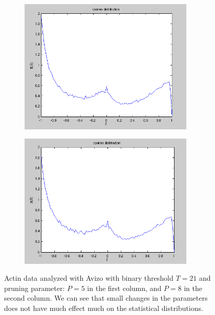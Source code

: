 \begin{figure}[H]
\begin{subfigure}{0.45\textwidth}
    \includegraphics[width=0.92\textwidth]{Figures/chapter-image/avizo/ActinZ39b21l5-histo-cosines.png}%
  \end{subfigure}
  \begin{subfigure}{0.45\textwidth}
    \centering
    \includegraphics[width=0.92\textwidth]{Figures/chapter-image/avizo/ActinZ39b21l8-histo-cosines.png}%
  \end{subfigure}

\caption[Distributions of length, degree, and cosines with Avizo for
actin with T=21,P=5]{Actin data analyzed with Avizo with binary threshold
$T=21$ and pruning parameter: $P=5$ in the first column, and  $P=8$ in the second
column. We can see that small changes in the parameters
does not have much effect much on the statistical distributions.}
\label{fig:avizo_histograms21}
\end{figure}

